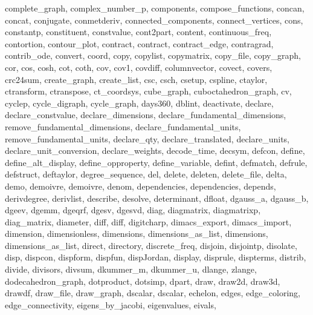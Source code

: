 {{    complete_graph,
    complex_number_p,
    components,
    compose_functions,
    concan,
    concat,
    conjugate,
    conmetderiv,
    connected_components,
    connect_vertices,
    cons,
    constantp,
    constituent,
    constvalue,
    cont2part,
    content,
    continuous_freq,
    contortion,
    contour_plot,
    contract,
    contract,
    contract_edge,
    contragrad,
    contrib_ode,
    convert,
    coord,
    copy,
    copylist,
    copymatrix,
    copy_file,
    copy_graph,
    cor,
    cos,
    cosh,
    cot,
    coth,
    cov,
    cov1,
    covdiff,
    columnvector,
    covect,
    covers,
    crc24sum,
    create_graph,
    create_list,
    csc,
    csch,
    csetup,
    cspline,
    ctaylor,
    ctransform,
    ctranspose,
    ct_coordsys,
    cube_graph,
    cuboctahedron_graph,
    cv,
    cyclep,
    cycle_digraph,
    cycle_graph,
    days360,
    dblint,
    deactivate,
    declare,
    declare_constvalue,
    declare_dimensions,
    declare_fundamental_dimensions,
    remove_fundamental_dimensions,
    declare_fundamental_units,
    remove_fundamental_units,
    declare_qty,
    declare_translated,
    declare_units,
    declare_unit_conversion,
    declare_weights,
    decode_time,
    decsym,
    defcon,
    define,
    define_alt_display,
    define_opproperty,
    define_variable,
    defint,
    defmatch,
    defrule,
    defstruct,
    deftaylor,
    degree_sequence,
    del,
    delete,
    deleten,
    delete_file,
    delta,
    demo,
    demoivre,
    demoivre,
    denom,
    dependencies,
    dependencies,
    depends,
    derivdegree,
    derivlist,
    describe,
    desolve,
    determinant,
    dfloat,
    dgauss_a,
    dgauss_b,
    dgeev,
    dgemm,
    dgeqrf,
    dgesv,
    dgesvd,
    diag,
    diagmatrix,
    diagmatrixp,
    diag_matrix,
    diameter,
    diff,
    diff,
    digitcharp,
    dimacs_export,
    dimacs_import,
    dimension,
    dimensionless,
    dimensions,
    dimensions_as_list,
    dimensions,
    dimensions_as_list,
    direct,
    directory,
    discrete_freq,
    disjoin,
    disjointp,
    disolate,
    disp,
    dispcon,
    dispform,
    dispfun,
    dispJordan,
    display,
    disprule,
    dispterms,
    distrib,
    divide,
    divisors,
    divsum,
    dkummer_m,
    dkummer_u,
    dlange,
    zlange,
    dodecahedron_graph,
    dotproduct,
    dotsimp,
    dpart,
    draw,
    draw2d,
    draw3d,
    drawdf,
    draw_file,
    draw_graph,
    dscalar,
    dscalar,
    echelon,
    edges,
    edge_coloring,
    edge_connectivity,
    eigens_by_jacobi,
    eigenvalues,
    eivals,
}}
